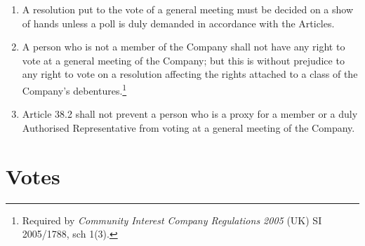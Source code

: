 \documentclass[a4paper,12pt]{article}
\begin{document}
\begin{enumerate}
  \item A resolution put to the vote of a general meeting must be decided on a show of hands unless a poll is duly demanded in accordance with the Articles.
  \color{red}
  \item A person who is not a member of the Company shall not have any right to vote at a general meeting of the Company; but this is without prejudice to any right to vote on a resolution affecting the rights attached to a class of the Company's debentures.\footnote{Required by \textit{Community Interest Company Regulations 2005} (UK) SI 2005/1788, sch 1(3).}\color{black}
  \item Article 38.2 shall not prevent a person who is a proxy for a member or a duly Authorised Representative from voting at a general meeting of the Company.
\end{enumerate}

\section{Votes}
\end{document}
